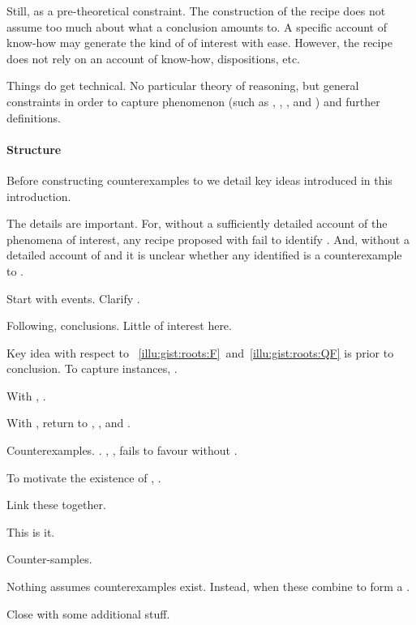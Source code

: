 \begin{note}
  Still, \issueInclusion{} as a pre-theoretical constraint.
  The construction of the recipe does not assume too much about what a conclusion amounts to.
  A specific account of know-how may generate the kind of  of interest with ease.
  However, the recipe does not rely on an account of know-how, dispositions, etc.

  Things do get technical.
  No particular theory of reasoning, but general constraints in order to capture phenomenon (such as , , , and ) and further definitions.
\end{note}

\paragraph*{Structure}


\begin{note}
  Before constructing counterexamples to \issueInclusion{} we detail key ideas introduced in this introduction.

  The details are important.
  For, without a sufficiently detailed account of the phenomena of interest, any recipe proposed with fail to identify .
  And, without a detailed account of \qWhy{} and \qHow{} it is unclear whether any identified  is a counterexample to \issueInclusion{}.

  Start with events.
  Clarify \qWhy{}.

  Following, conclusions.
  Little of interest here.

  Key idea with respect to ~\ref{illu:gist:roots:F}~and~\ref{illu:gist:roots:QF} is \ros{} prior to conclusion.
  To capture instances, .

  With , .

  With , return to \qWhy{}, \qHow{}, and \issueInclusion{}.

  Counterexamples.
  .
  , , fails to favour without .

  To motivate the existence of , \tC{}.

  Link these together.

  This is it.

  Counter-samples.

  Nothing assumes counterexamples exist.
  Instead, when these combine to form a \scen{}.

  Close with some additional stuff.
\end{note}



